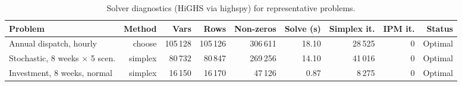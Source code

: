 \begin{table}[htbp]
\centering
\footnotesize
\caption{Solver diagnostics (HiGHS via highspy) for representative problems.}
\label{tab:solver}
\begin{adjustbox}{max width=\linewidth}
\begin{tabular}{lrrrrrrrr}
\toprule
Problem & Method & Vars & Rows & Non-zeros & Solve (s) & Simplex it. & IPM it. & Status \\
\midrule
Annual dispatch, hourly & choose & 105\,128 & 105\,126 & 306\,611 & 18.10 & 28\,525 & 0 & Optimal \\
Stochastic, 8 weeks × 5 scen. & simplex & 80\,732 & 80\,847 & 269\,256 & 14.10 & 41\,016 & 0 & Optimal \\
Investment, 8 weeks, normal & simplex & 16\,150 & 16\,170 & 47\,126 & 0.87 & 8\,275 & 0 & Optimal \\
\bottomrule
\end{tabular}
\end{adjustbox}
\end{table}
